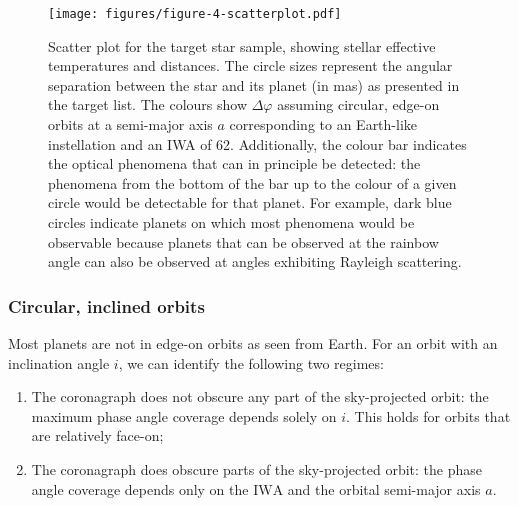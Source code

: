 \documentclass[
    usenatbib,
]{mnras}
\newcommand{\IWA}{\ensuremath{\mathrm{IWA}}}
\begin{document}
\begin{figure*}
    \centering
    \texttt{[image: figures/figure-4-scatterplot.pdf]}
    \caption{
        Scatter plot for the target star sample, showing stellar effective 
        temperatures and distances.
        The circle sizes represent the angular separation between 
        the star and its planet (in mas) as presented in the target list.
        The colours show $\Delta \varphi$ assuming circular, edge-on orbits
        at a semi-major axis $a$ corresponding to an Earth-like 
        instellation and an IWA of \qty{62}{\mas}.
        Additionally, the colour bar indicates the optical phenomena that 
        can in principle be detected: the phenomena from the bottom of the bar up to the colour of a given circle would be detectable for that planet.
        For example, dark blue circles indicate planets on which most phenomena would be observable because planets that can be observed at the rainbow angle can also be observed at angles exhibiting Rayleigh scattering.
    }
    \label{fig:scatterplot}
\end{figure*}


\subsubsection{Circular, inclined orbits}

Most planets are not in edge-on orbits as seen from Earth.
%
For an orbit with an inclination angle $i$, we can identify the following two regimes:%
\begin{enumerate}
    \item The coronagraph does not obscure any part of the sky-projected orbit: 
    the maximum phase angle coverage depends solely on $i$. This 
    holds for orbits that are relatively face-on; 
    \item The coronagraph does obscure parts of the sky-projected orbit: 
    the phase angle coverage depends only on the \IWA{} and 
    the orbital semi-major axis $a$. 
\end{enumerate}
\end{document}
